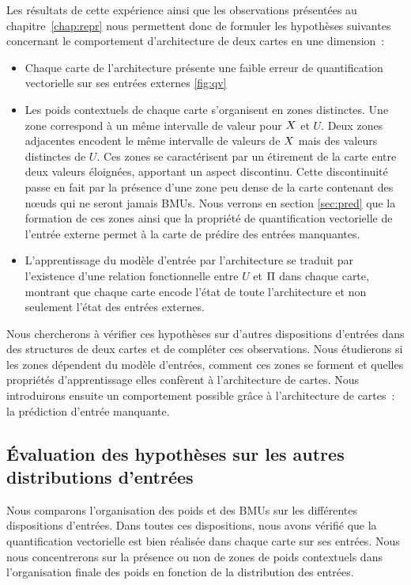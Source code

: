 \documentclass[../main]{subfiles}
\begin{document}
Les résultats de cette expérience ainsi que les observations présentées au chapitre~\ref{chap:repr} nous permettent donc de formuler les hypothèses suivantes concernant le comportement d'architecture de deux cartes en une dimension~:

\begin{itemize}
	\item Chaque carte de l'architecture présente une faible erreur de quantification vectorielle sur ses entrées externes \ref{fig:qv}
	\item Les poids contextuels de chaque carte s'organisent en zones distinctes. Une zone correspond à un même intervalle de valeur pour $X$ et $U$. Deux zones adjacentes encodent le même intervalle de valeurs de $X$ mais des valeurs distinctes de $U$. Ces zones se caractérisent par un étirement de la carte entre deux valeurs éloignées, apportant un aspect discontinu. Cette discontinuité passe en fait par la présence d'une zone peu dense de la carte contenant des n\oe{}uds qui ne seront jamais BMUs. Nous verrons en section \ref{sec:pred} que la formation de ces zones ainsi que la propriété de quantification vectorielle de l'entrée externe permet à la carte de prédire des entrées manquantes.
	\item L'apprentissage du modèle d'entrée par l'architecture se traduit par l'existence d'une relation fonctionnelle entre $U$ et $\Pi$ dans chaque carte, montrant que chaque carte encode l'état de toute l'architecture et non seulement l'état des entrées externes.
\end{itemize}

Nous chercherons à vérifier ces hypothèses sur d'autres dispositions d'entrées dans des structures de deux cartes et de compléter ces observations.
Nous étudierons si les zones dépendent du modèle d'entrées, comment ces zones se forment et quelles propriétés d'apprentissage elles confèrent à l'architecture de cartes.
Nous introduirons ensuite un comportement possible grâce à l'architecture de cartes~: la prédiction d'entrée manquante.

\subsection{\'Evaluation des hypothèses sur les autres distributions d'entrées}

Nous comparons l'organisation des poids et des BMUs sur les différentes dispositions d'entrées.
Dans toutes ces dispositions, nous avons vérifié que la quantification vectorielle est bien réalisée dans chaque carte sur ses entrées. Nous nous concentrerons sur la présence ou non de zones de poids contextuels dans l'organisation finale des poids en fonction de la distribution des entrées.
\end{document}
